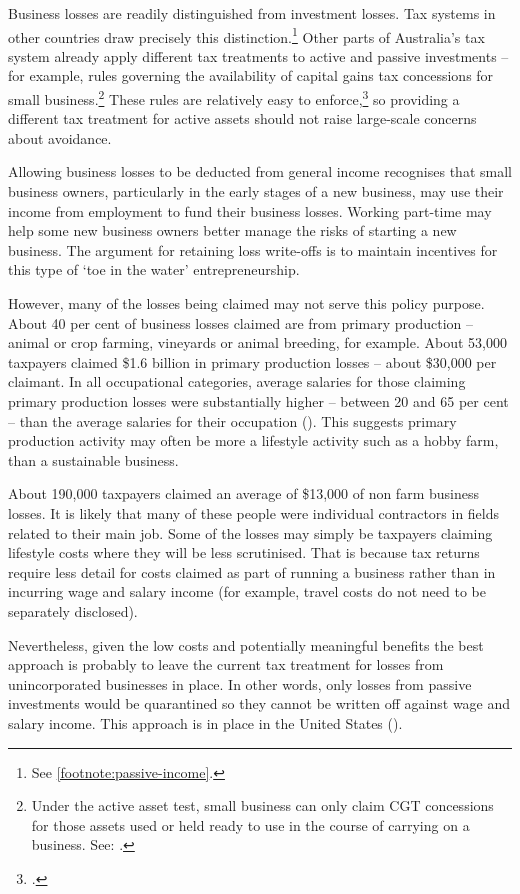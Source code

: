 Business losses are readily distinguished from investment losses. Tax systems in other countries draw precisely this distinction.\footnote{See \stopifendnote{}\vref{footnote:passive-income}.} Other parts of Australia’s tax system already apply different tax treatments to active and passive investments – for example, rules governing the availability of capital gains tax concessions for small business.\footnote{Under the active asset test, small business can only claim CGT concessions for those assets used or held ready to use in the course of carrying on a business. See: \textcite{ATO2015ActiveAssetTest}.} These rules are relatively easy to enforce,\footcite{Mather2016} so providing a different tax treatment for active assets should not raise large-scale concerns about avoidance. 

Allowing business losses to be deducted from general income recognises that small business owners, particularly in the early stages of a new business, may use their income from employment to fund their business losses. Working part-time may help some new business owners better manage the risks of starting a new business. The argument for retaining loss write-offs is to maintain incentives for this type of ‘toe in the water’ entrepreneurship. 

However, many of the losses being claimed may not serve this policy purpose. About 40 per cent of business losses claimed are from primary production – animal or crop farming, vineyards or animal breeding, for example. About 53,000 taxpayers claimed \$1.6 billion in primary production losses – about \$30,000 per claimant. In all occupational categories, average salaries for those claiming primary production losses were substantially higher – between 20 and 65 per cent – than the average salaries for their occupation (). This suggests primary production activity may often be more a lifestyle activity such as a hobby farm, than a sustainable business.


About 190,000 taxpayers claimed an average of \$13,000 of non farm business losses. It is likely that many of these people were individual contractors in fields related to their main job. Some of the losses may simply be taxpayers claiming lifestyle costs where they will be less scrutinised. 
That is because tax returns require less detail for costs claimed as part of running a business rather than in incurring wage and salary income (for example, travel costs do not need to be separately disclosed). 

Nevertheless, given the low costs and potentially meaningful benefits the best approach is probably to leave the current tax treatment for losses from unincorporated businesses in place. 
In other words, only losses from passive investments would be quarantined so they cannot be written off against wage and salary income. 
This approach is in place in the United States (). 

